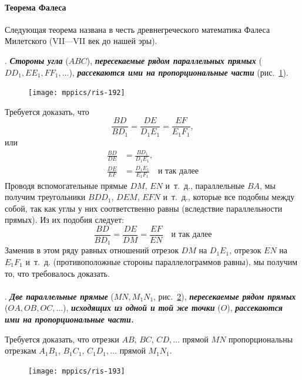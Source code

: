 \documentclass[twoside]{book}
\begin{document}
\paragraph{Теорема Фалеса}\label{1938/182}
Следующая теорема названа в честь древнегреческого математика Фалеса Милетского (VII---VII век до нашей эры).


\smallskip
{}.
\textbf{\emph{Стороны угла}} ($ABC$), \textbf{\emph{пересекаемые рядом параллельных прямых}} ($DD_1, EE_1, FF_1, \dots$), \textbf{\emph{рассекаются ими на пропорциональные части}} (рис.~\ref{1938/ris-192}).

\begin{figure}[h!]
\centering
\texttt{[image: mppics/ris-192]}
\caption{}\label{1938/ris-192}
\end{figure}

Требуется доказать, что
\[\frac{BD}{BD_1}=\frac{DE}{D_1E_1}=\frac{EF}{E_1F_1},\]
или
\begin{align*}
\frac{BD}{DE}&=\frac{BD_1}{D_1E_1},
\\
\frac{DE}{EF}&=\frac{D_1E_1}{E_1F_1}\quad\text{и так далее}
\end{align*}
Проводя вспомогательные прямые $DM$, $EN$ и~т.~д., параллельные $BA$, мы получим треугольники $BDD_1$, $DEM$, $EFN$ и~т.~д., которые все подобны между собой, так как углы у них соответственно равны (вследствие параллельности прямых).
Из их подобия следует:
\[\frac{BD}{BD_1}=\frac{DE}{DM}=\frac{EF}{EN}\quad\text{и так далее}\]
Заменив в этом ряду равных отношений отрезок $DM$ на $D_1E_1$, отрезок $EN$ на $E_1F_1$ и~т.~д.
(противоположные стороны параллелограммов равны), мы получим то, что требовалось доказать.

\paragraph{}\label{1938/183}
.
\textbf{\emph{Две параллельные прямые}} ($MN, M_1N_1$, рис.~\ref{1938/ris-193}), \textbf{\emph{пересекаемые рядом прямых}} ($OA, OB, OC, \dots$), \textbf{\emph{исходящих из одной и той же точки}} ($O$), \textbf{\emph{рассекаются ими на пропорциональные части.}}

Требуется доказать, что отрезки $AB$, $BC$, $CD,\dots$
прямой $MN$ пропорциональны отрезкам $A_1B_1$, $B_1C_1$, $C_1D_1,\dots$
прямой $M_1N_1$.

\begin{figure}[h!]
\centering
\texttt{[image: mppics/ris-193]}
\caption{}\label{1938/ris-193}
\end{figure}
\end{document}
